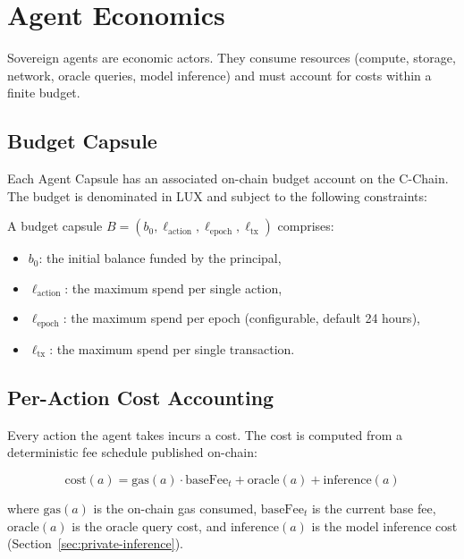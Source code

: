 \section{Agent Economics}
\label{sec:economics}

Sovereign agents are economic actors. They consume resources (compute, storage, network, oracle queries, model inference) and must account for costs within a finite budget.

\subsection{Budget Capsule}

Each Agent Capsule has an associated on-chain budget account on the C-Chain. The budget is denominated in LUX and subject to the following constraints:

\begin{definition}
A budget capsule $B = (b_0, \ell_{\text{action}}, \ell_{\text{epoch}}, \ell_{\text{tx}})$ comprises:
\begin{itemize}
    \item $b_0$: the initial balance funded by the principal,
    \item $\ell_{\text{action}}$: the maximum spend per single action,
    \item $\ell_{\text{epoch}}$: the maximum spend per epoch (configurable, default 24 hours),
    \item $\ell_{\text{tx}}$: the maximum spend per single transaction.
\end{itemize}
\end{definition}

\subsection{Per-Action Cost Accounting}

Every action the agent takes incurs a cost. The cost is computed from a deterministic fee schedule published on-chain:

\begin{equation}\label{eq:cost}
    \text{cost}(a) = \text{gas}(a) \cdot \text{baseFee}_t + \text{oracle}(a) + \text{inference}(a)
\end{equation}

where $\text{gas}(a)$ is the on-chain gas consumed, $\text{baseFee}_t$ is the current base fee, $\text{oracle}(a)$ is the oracle query cost, and $\text{inference}(a)$ is the model inference cost (Section~\ref{sec:private-inference}).


